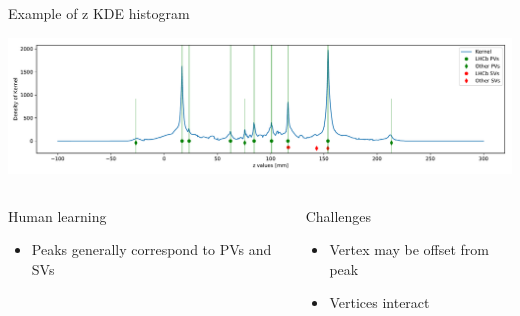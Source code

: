 \begin{frame}{Example of z KDE histogram}
\begin{center}
    \includegraphics[width=\textwidth, trim=50 30 50 30]{images/kernel_and_pvs.pdf}
\end{center}
\begin{columns}[t]
    \begin{block}{Human learning}
    \begin{itemize}
        \item Peaks generally correspond to PVs and SVs
    \end{itemize}
    \end{block}

    \begin{block}{Challenges}
    \begin{itemize}
        \item Vertex may be offset from peak
        \item Vertices interact
    \end{itemize}
    \end{block}
\end{columns}
\end{frame}
